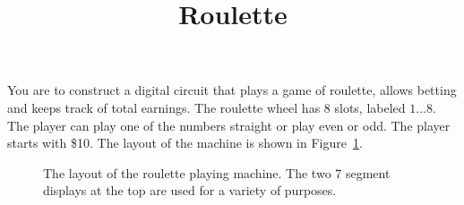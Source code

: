 \documentclass{article}[10 pt,landscape]
\begin{document}
\newcommand{\bs}{\backslash}

\title{Roulette}

You are to construct a digital circuit that plays a game of
roulette, allows betting and keeps track of total earnings.
The roulette wheel has 8 slots, labeled $1 \ldots 8$.  The player
can play one of the numbers straight or play even or odd.
The player starts with \$10.
The layout of the machine is shown in Figure~\ref{fig:Roulette}.
\begin{figure}[ht]
    \caption{The layout of the roulette playing machine.
        The two 7 segment displays at the top are used for a variety
    of purposes.}
    \label{fig:Roulette}
\end{figure}
\end{document}
